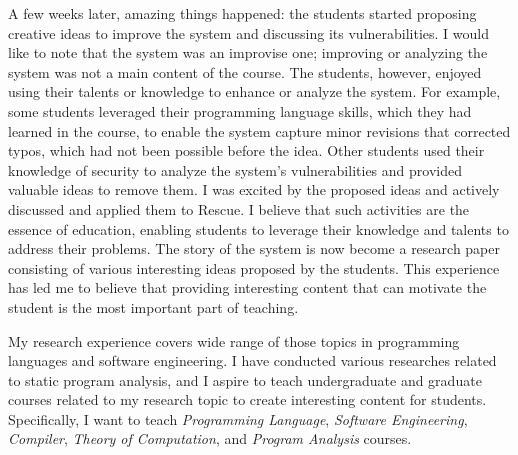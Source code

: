 \documentclass[a4paper, 11pt]{article}
\begin{document}
\begin{small}
A few weeks later, amazing things happened: the students started proposing creative ideas to improve the system and discussing its vulnerabilities. I would like to note that the system was an improvise one; improving or analyzing the system was not a main content of the course. The students, however, enjoyed using their talents or knowledge to enhance or analyze the system. For example, some students leveraged their programming language skills, which they had learned in the course, to enable the system capture minor revisions that corrected typos, which had not been possible before the idea. 
Other students used their knowledge of security to analyze the system's vulnerabilities and provided valuable ideas to remove them. 
I was excited by the proposed ideas and actively discussed and applied them to Rescue. 
I believe that such activities are the essence of education, enabling students to leverage their knowledge and talents to address their problems. 
The story of the system is now become a research paper consisting of various interesting ideas proposed by the students.
This experience has led me to believe that providing interesting content that can motivate the student is the most important part of teaching.









My research experience covers wide range of those topics in programming languages and software engineering. 
I have conducted various researches related to static program analysis, and I aspire to teach undergraduate and graduate courses related to my research topic to create interesting content for students.
Specifically, I want to teach {\it Programming Language}, {\it Software Engineering}, {\it Compiler}, {\it Theory of Computation}, and {\it Program Analysis} courses. 






\end{small}
\end{document}
